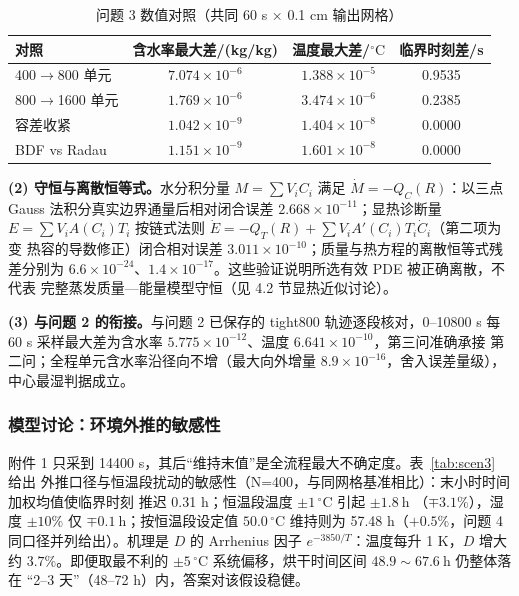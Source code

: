 \begin{table}[htbp]
  \centering
  \caption{问题 3 数值对照（共同 60 s × 0.1 cm 输出网格）}
  \label{tab:verify3}
  \begin{tabular}{lccc}
    \hline
    对照 & 含水率最大差/(kg/kg) & 温度最大差/$^{\circ}\mathrm{C}$ & 临界时刻差/s \\
    \hline
    400$\to$800 单元 & $7.074\times10^{-6}$ & $1.388\times10^{-5}$ & 0.9535 \\
    800$\to$1600 单元 & $1.769\times10^{-6}$ & $3.474\times10^{-6}$ & 0.2385 \\
    容差收紧 & $1.042\times10^{-9}$ & $1.404\times10^{-8}$ & 0.0000 \\
    BDF vs Radau & $1.151\times10^{-9}$ & $1.601\times10^{-8}$ & 0.0000 \\
    \hline
  \end{tabular}
\end{table}

\textbf{(2) 守恒与离散恒等式。}水分积分量 $M=\sum V_iC_i$ 满足 $\dot M=-Q_C(R)$：以三点
Gauss 法积分真实边界通量后相对闭合误差 $2.668\times10^{-11}$；显热诊断量
$E=\sum V_iA(C_i)T_i$ 按链式法则 $\dot E=-Q_T(R)+\sum V_iA'(C_i)T_i\dot C_i$（第二项为变
热容的导数修正）闭合相对误差 $3.011\times10^{-10}$；质量与热方程的离散恒等式残差分别为
$6.6\times10^{-24}$、$1.4\times10^{-17}$。这些验证说明所选有效 PDE 被正确离散，不代表
完整蒸发质量—能量模型守恒（见 4.2 节显热近似讨论）。

\textbf{(3) 与问题 2 的衔接。}与问题 2 已保存的 tight800 轨迹逐段核对，0–10800 s 每 60 s
采样最大差为含水率 $5.775\times10^{-12}$、温度 $6.641\times10^{-10}$，第三问准确承接
第二问；全程单元含水率沿径向不增（最大向外增量 $8.9\times10^{-16}$，舍入误差量级），
中心最湿判据成立。

\subsubsection{模型讨论：环境外推的敏感性}

附件 1 只采到 14400 s，其后“维持末值”是全流程最大不确定度。表~\ref{tab:scen3} 给出
外推口径与恒温段扰动的敏感性（N=400，与同网格基准相比）：末小时时间加权均值使临界时刻
推迟 0.31 h；恒温段温度 $\pm1\,^{\circ}\mathrm{C}$ 引起 $\pm1.8\ \mathrm{h}$
（$\mp3.1\%$），湿度 $\pm10\%$ 仅 $\mp0.1\ \mathrm{h}$；按恒温段设定值
$50.0\,^{\circ}\mathrm{C}$ 维持则为 57.48 h（$+0.5\%$，问题 4 同口径并列给出）。机理是
$D$ 的 Arrhenius 因子 $e^{-3850/T}$：温度每升 1 K，$D$ 增大约 $3.7\%$。即便取最不利的
$\pm5\,^{\circ}\mathrm{C}$ 系统偏移，烘干时间区间 $48.9\sim67.6\ \mathrm{h}$ 仍整体落在
“2–3 天”（48–72 h）内，答案对该假设稳健。

